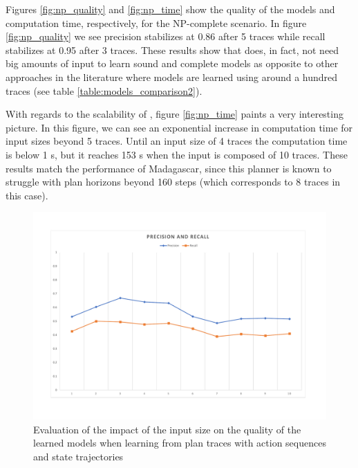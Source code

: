 Figures \ref{fig:np_quality} and \ref{fig:np_time} show the quality of the models and computation time, respectively, for the NP-complete scenario. In figure \ref{fig:np_quality} we see precision stabilizes at 0.86 after 5 traces while recall stabilizes at 0.95 after 3 traces. These results show that \FAMA does, in fact, not need big amounts of input to learn sound and complete models as opposite to other approaches in the literature where models are learned using around a hundred traces (see table \ref{table:models_comparison2}).

With regards to the scalability of \FAMA, figure \ref{fig:np_time} paints a very interesting picture. In this figure, we can see an exponential increase in computation time for input sizes beyond 5 traces. Until an input size of 4 traces the computation time is below 1 s, but it reaches 153 s when the input is composed of 10 traces. These results match the performance of {\sc Madagascar}, since this planner is known to struggle with plan horizons beyond 160 steps (which corresponds to 8 traces in this case).


\begin{figure}[hbt!]
	\centering
	\includegraphics[width=0.8\linewidth]{figures/input_size_0_0_precision.pdf}
	\caption{Evaluation of the impact of the input size on the quality of the learned models when learning from plan traces with \NO action sequences and \NO state trajectories}
	\label{fig:pspace_quality}
\end{figure}

